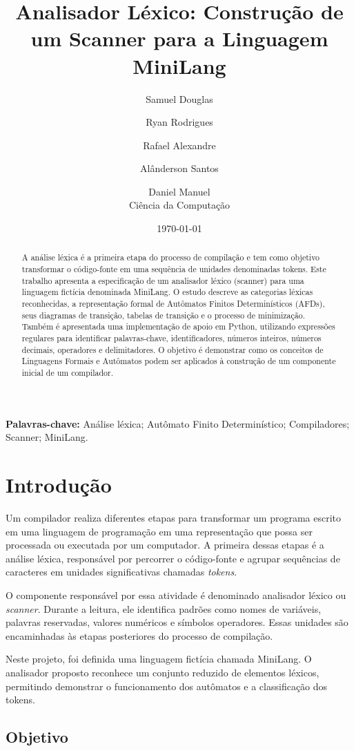 \documentclass[12pt,a4paper]{article}
\title{\textbf{Analisador Léxico: Construção de um Scanner para a Linguagem MiniLang}}
\author{
Samuel Douglas \and Ryan Rodrigues \and Rafael Alexandre \and
Alânderson Santos \and Daniel Manuel\\[0.4em]
\small Ciência da Computação
}
\date{\today}
\begin{document}
\maketitle

\begin{abstract}
A análise léxica é a primeira etapa do processo de compilação e tem como
objetivo transformar o código-fonte em uma sequência de unidades denominadas
tokens. Este trabalho apresenta a especificação de um analisador léxico
(scanner) para uma linguagem fictícia denominada MiniLang. O estudo descreve
as categorias léxicas reconhecidas, a representação formal de Autômatos
Finitos Determinísticos (AFDs), seus diagramas de transição, tabelas de
transição e o processo de minimização. Também é apresentada uma implementação
de apoio em Python, utilizando expressões regulares para identificar
palavras-chave, identificadores, números inteiros, números decimais,
operadores e delimitadores. O objetivo é demonstrar como os conceitos de
Linguagens Formais e Autômatos podem ser aplicados à construção de um
componente inicial de um compilador.
\end{abstract}

\noindent\textbf{Palavras-chave:} Análise léxica; Autômato Finito Determinístico;
Compiladores; Scanner; MiniLang.

\section{Introdução}

Um compilador realiza diferentes etapas para transformar um programa escrito
em uma linguagem de programação em uma representação que possa ser processada
ou executada por um computador. A primeira dessas etapas é a análise léxica,
responsável por percorrer o código-fonte e agrupar sequências de caracteres
em unidades significativas chamadas \textit{tokens}.

O componente responsável por essa atividade é denominado analisador léxico
ou \textit{scanner}. Durante a leitura, ele identifica padrões como nomes de
variáveis, palavras reservadas, valores numéricos e símbolos operadores.
Essas unidades são encaminhadas às etapas posteriores do processo de
compilação.

Neste projeto, foi definida uma linguagem fictícia chamada MiniLang. O
analisador proposto reconhece um conjunto reduzido de elementos léxicos,
permitindo demonstrar o funcionamento dos autômatos e a classificação dos
tokens.

\subsection{Objetivo}
\end{document}
